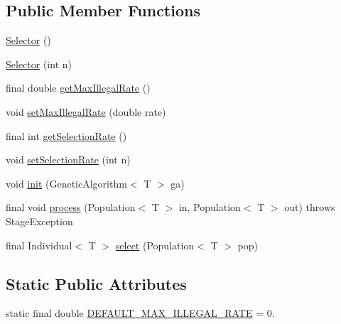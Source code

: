 \subsection*{Public Member Functions}
\begin{DoxyCompactItemize}
\item 
\hyperlink{classjenes_1_1stage_1_1operator_1_1_selector_3_01_t_01extends_01_chromosome_01_4_a83052368d6df966944bc5178f1eebed0}{Selector} ()
\item 
\hyperlink{classjenes_1_1stage_1_1operator_1_1_selector_3_01_t_01extends_01_chromosome_01_4_a07f05455c1fabfb8ad3f6468a653aed8}{Selector} (int n)
\item 
final double \hyperlink{classjenes_1_1stage_1_1operator_1_1_selector_3_01_t_01extends_01_chromosome_01_4_a6e6f7842d22da347196a8cd772bea0e1}{get\-Max\-Illegal\-Rate} ()
\item 
void \hyperlink{classjenes_1_1stage_1_1operator_1_1_selector_3_01_t_01extends_01_chromosome_01_4_a68ffd7e37d617f2f71628ce3659a8457}{set\-Max\-Illegal\-Rate} (double rate)
\item 
final int \hyperlink{classjenes_1_1stage_1_1operator_1_1_selector_3_01_t_01extends_01_chromosome_01_4_a17809883b498ec5764c5aa38d04bda8b}{get\-Selection\-Rate} ()
\item 
void \hyperlink{classjenes_1_1stage_1_1operator_1_1_selector_3_01_t_01extends_01_chromosome_01_4_aa67094343d09f80b0ce35d0f20a517d5}{set\-Selection\-Rate} (int n)
\item 
void \hyperlink{classjenes_1_1stage_1_1operator_1_1_selector_3_01_t_01extends_01_chromosome_01_4_a780969225a2e48774e71af8bd4e0063e}{init} (Genetic\-Algorithm$<$ T $>$ ga)
\item 
final void \hyperlink{classjenes_1_1stage_1_1operator_1_1_selector_3_01_t_01extends_01_chromosome_01_4_a11275bed8b009ece669a5c88c6e10b55}{process} (Population$<$ T $>$ in, Population$<$ T $>$ out)  throws Stage\-Exception 
\item 
final Individual$<$ T $>$ \hyperlink{classjenes_1_1stage_1_1operator_1_1_selector_3_01_t_01extends_01_chromosome_01_4_a9ef7b0bef2ffcb84eeb231ae37ab0239}{select} (Population$<$ T $>$ pop)
\end{DoxyCompactItemize}
\subsection*{Static Public Attributes}
\begin{DoxyCompactItemize}
\item 
static final double \hyperlink{classjenes_1_1stage_1_1operator_1_1_selector_3_01_t_01extends_01_chromosome_01_4_a81263464a18d2ee1ecddf41f2e97fd89}{D\-E\-F\-A\-U\-L\-T\-\_\-\-M\-A\-X\-\_\-\-I\-L\-L\-E\-G\-A\-L\-\_\-\-R\-A\-T\-E} = 0.
\end{DoxyCompactItemize}
